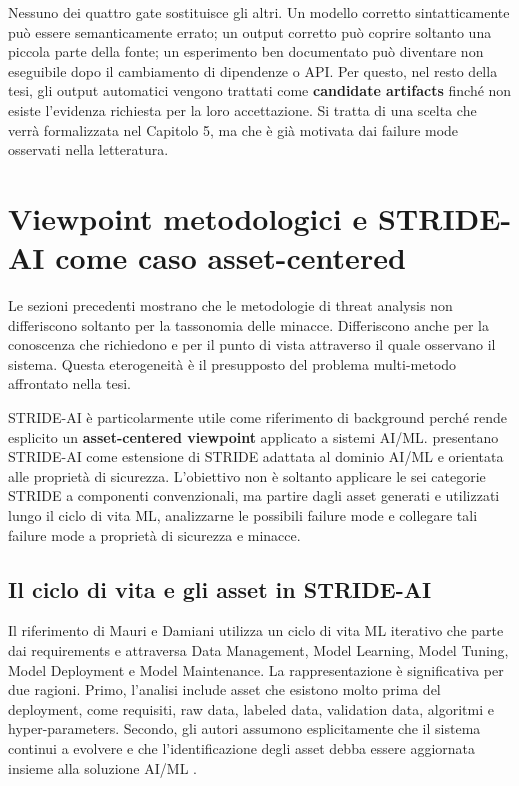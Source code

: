 \documentclass[12pt,a4paper,oneside]{report}
\begin{document}
Nessuno dei quattro gate sostituisce gli altri. Un modello corretto sintatticamente può essere semanticamente errato; un output corretto può coprire soltanto una piccola parte della fonte; un esperimento ben documentato può diventare non eseguibile dopo il cambiamento di dipendenze o API. Per questo, nel resto della tesi, gli output automatici vengono trattati come \textbf{candidate artifacts} finché non esiste l'evidenza richiesta per la loro accettazione. Si tratta di una scelta che verrà formalizzata nel Capitolo 5, ma che è già motivata dai failure mode osservati nella letteratura.

\section{Viewpoint metodologici e STRIDE-AI come caso asset-centered}

Le sezioni precedenti mostrano che le metodologie di threat analysis non differiscono soltanto per la tassonomia delle minacce. Differiscono anche per la conoscenza che richiedono e per il punto di vista attraverso il quale osservano il sistema. Questa eterogeneità è il presupposto del problema multi-metodo affrontato nella tesi.

STRIDE-AI è particolarmente utile come riferimento di background perché rende esplicito un \textbf{asset-centered viewpoint} applicato a sistemi AI/ML. \citet{mauri2022strideai} presentano STRIDE-AI come estensione di STRIDE adattata al dominio AI/ML e orientata alle proprietà di sicurezza. L'obiettivo non è soltanto applicare le sei categorie STRIDE a componenti convenzionali, ma partire dagli asset generati e utilizzati lungo il ciclo di vita ML, analizzarne le possibili failure mode e collegare tali failure mode a proprietà di sicurezza e minacce.

\subsection{Il ciclo di vita e gli asset in STRIDE-AI}

Il riferimento di Mauri e Damiani utilizza un ciclo di vita ML iterativo che parte dai requirements e attraversa Data Management, Model Learning, Model Tuning, Model Deployment e Model Maintenance. La rappresentazione è significativa per due ragioni. Primo, l'analisi include asset che esistono molto prima del deployment, come requisiti, raw data, labeled data, validation data, algoritmi e hyper-parameters. Secondo, gli autori assumono esplicitamente che il sistema continui a evolvere e che l'identificazione degli asset debba essere aggiornata insieme alla soluzione AI/ML \citep{mauri2022strideai}.
\end{document}
